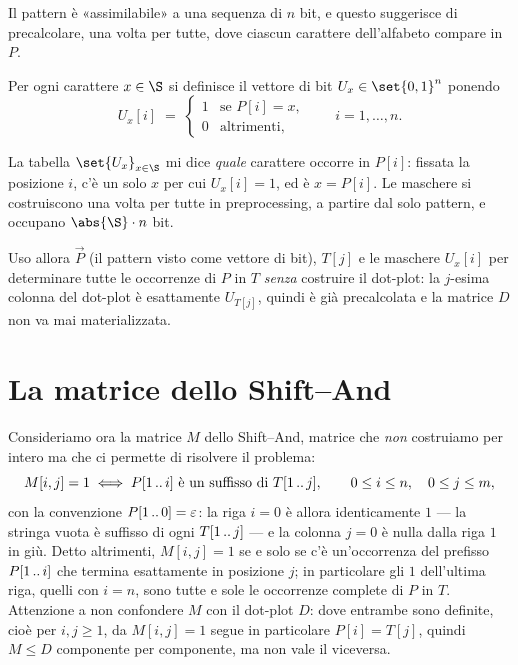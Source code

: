 Il pattern è «assimilabile» a una sequenza di $n$ bit, e questo suggerisce di precalcolare, una
volta per tutte, dove ciascun carattere dell'alfabeto compare in $P$.

\begin{definizione}
\label{def:shift-and-maschere}
Per ogni carattere $x\in\alfa$ si definisce il vettore di bit $U_x\in\set{0,1}^n$ ponendo
\[
  U_x[i]\;=\;
  \begin{cases}
    1 & \text{se } P[i]=x,\\[2pt]
    0 & \text{altrimenti,}
  \end{cases}
  \qquad i=1,\dots,n .
\]
\end{definizione}

La tabella $\set{U_x}_{x\in\alfa}$ mi dice \emph{quale} carattere occorre in $P[i]$: fissata la
posizione $i$, c'è un solo $x$ per cui $U_x[i]=1$, ed è $x=P[i]$. Le maschere si costruiscono una
volta per tutte in preprocessing, a partire dal solo pattern, e occupano $\abs{\alfa}\cdot n$ bit.

Uso allora $\vec{P}$ (il pattern visto come vettore di bit), $T[j]$ e le maschere $U_x[i]$ per
determinare tutte le occorrenze di $P$ in $T$ \emph{senza} costruire il dot-plot: la $j$-esima
colonna del dot-plot è esattamente $U_{T[j]}$, quindi è già precalcolata e la matrice $D$ non va
mai materializzata.


\section{La matrice dello Shift--And}
\label{sec:shift-and-matrice}

Consideriamo ora la matrice $M$ dello Shift--And, matrice che \emph{non} costruiamo per intero ma
che ci permette di risolvere il problema:
\[
  M[i,j]=1 \iff P[1\,..\,i]\ \text{è un suffisso di}\ T[1\,..\,j],
  \qquad 0\le i\le n,\quad 0\le j\le m ,
\]
con la convenzione $P[1\,..\,0]=\varepsilon$: la riga $i=0$ è allora identicamente $1$ --- la stringa
vuota è suffisso di ogni $T[1\,..\,j]$ --- e la colonna $j=0$ è nulla dalla riga $1$ in giù.
Detto altrimenti, $M[i,j]=1$ se e solo se c'è un'occorrenza del prefisso $P[1\,..\,i]$ che termina
esattamente in posizione $j$; in particolare gli $1$ dell'ultima riga, quelli con $i=n$, sono
tutte e sole le occorrenze complete di $P$ in $T$. Attenzione a non confondere $M$ con il
dot-plot $D$: dove entrambe sono definite, cioè per $i,j\ge 1$, da $M[i,j]=1$ segue in
particolare $P[i]=T[j]$, quindi $M\le D$ componente per componente, ma non vale il viceversa.

